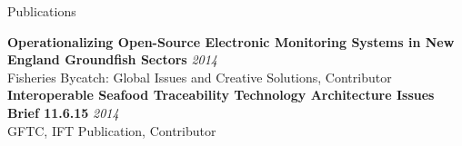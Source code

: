 \documentclass{resume} %
\begin{document}

\begin{rSection}{Publications}

{\bf Operationalizing Open-Source Electronic Monitoring Systems in New England Groundfish Sectors} \hfill {\em 2014} \\ 
Fisheries Bycatch: Global Issues and Creative Solutions, Contributor \\

{\bf Interoperable Seafood Traceability Technology Architecture Issues Brief 11.6.15} \hfill {\em 2014} \\ 
GFTC, IFT Publication, Contributor \\

\end{rSection}
\end{document}
